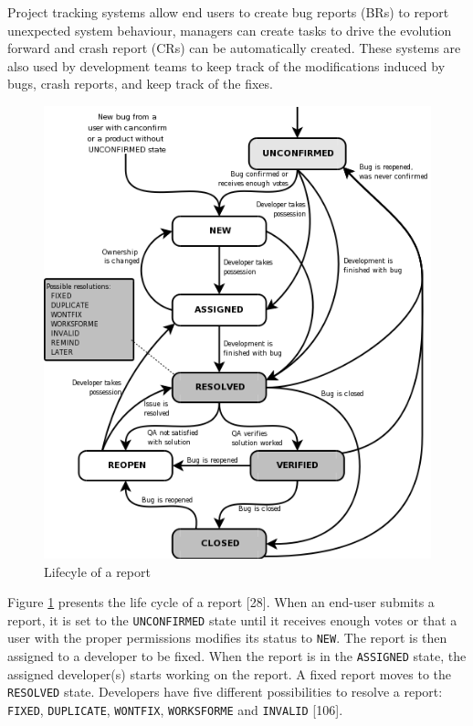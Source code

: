 \documentclass[12pt]{report}
\begin{document}
Project tracking systems allow end users to create bug reports (BRs) to
report unexpected system behaviour, managers can create tasks to drive
the evolution forward and crash report (CRs) can be automatically
created. These systems are also used by development teams to keep track
of the modifications induced by bugs, crash reports, and keep track of
the fixes.

\begin{figure}[h!]
    \centering
    \includegraphics[scale=0.7]{media/bzLifecycle.png}
    \caption{Lifecyle of a report}
    \label{fig:bug-lifecyle}
\end{figure}

Figure \ref{fig:bug-lifecyle} presents the life cycle of a report
{[}28{]}. When an end-user submits a report, it is set to the
\lstinline!UNCONFIRMED! state until it receives enough votes or that a
user with the proper permissions modifies its status to \lstinline!NEW!.
The report is then assigned to a developer to be fixed. When the report
is in the \lstinline!ASSIGNED! state, the assigned developer(s) starts
working on the report. A fixed report moves to the \lstinline!RESOLVED!
state. Developers have five different possibilities to resolve a report:
\lstinline!FIXED!, \lstinline!DUPLICATE!, \lstinline!WONTFIX!,
\lstinline!WORKSFORME! and \lstinline!INVALID! {[}106{]}.
\end{document}
